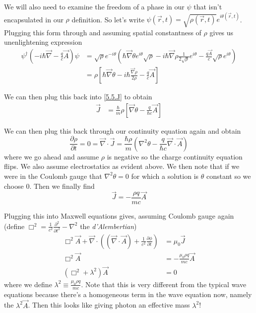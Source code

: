 \documentclass[10pt]{report}
\newcommand{\pd}[2]{\frac{\partial #1}{\partial#2}}
\newcommand{\ptd}[2]{\frac{\partial^2 #1}{\partial#2^2}}
\begin{document}
We will also need to examine the freedom of a phase in our $\psi$ that isn't encapsulated in our $\rho$ definition. So let's write $\psi(\vec{r},t) = \sqrt{\rho(\vec{r},t)} e^{i\theta(\vec{r},t)}$. Plugging this form through and assuming spatial constantness of $\rho$ gives us unenlightening expression
\begin{align}
    \psi^\dagger\left( -i\hbar \vec{\nabla} - \frac{q}{c}\vec{A} \right)\psi &= \sqrt{\rho}e^{-i\theta}\left( \hbar \vec{\nabla}\theta e^{i\theta}\sqrt{\rho} - i\hbar \vec{\nabla}\rho \frac{1}{2\sqrt{\rho}}e^{i\theta} - \frac{q\vec{A}}{c}\sqrt{\rho}e^{i\theta} \right)\\
    &= \rho\left[ \hbar \vec{\nabla}\theta - i\hbar\frac{\vec{\nabla}\rho}{2\rho} - \frac{q}{c}\vec{A} \right]
\end{align}

We can then plug this back into \eqref{5.5.J} to obtain
\begin{align}
    \vec{J} &= \frac{\hbar}{m}\rho\left[ \vec{\nabla}\theta - \frac{q}{\hbar c}\vec{A} \right]
\end{align}

We can then plug this back through our continuity equation again and obtain
\begin{equation}
    \pd{\rho}{t} = 0 = \vec{\nabla} \cdot \vec{J} = \frac{\hbar \rho}{m}\left( \nabla^2 \theta - \frac{q}{\hbar c}\vec{\nabla} \cdot \vec{A} \right)
\end{equation}
where we go ahead and assume $\rho$ is negative so the charge continuity equation flips. We also assume electrostatics as evident above. We then note that if we were in the Coulomb gauge that $\nabla^2 \theta = 0$ for which a solution is $\theta$ constant so we choose $0$. Then we finally find
\begin{equation}
    \vec{J} = -\frac{\rho q}{mc}\vec{A}
\end{equation}

Plugging this into Maxwell equations gives, assuming Coulomb gauge again (define $\Box^2 = \frac{1}{c^2}\ptd{}{t} - \nabla^2$ the \emph{d'Alembertian})
\begin{align}
    \Box^2 \vec{A} + \vec{\nabla} \cdot \left( \left( \vec{\nabla} \cdot \vec{A} \right) + \frac{1}{c^2}\pd{\phi}{t} \right) &= \mu_0 \vec{J}\\
    \Box^2 \vec{A} &= -\frac{\mu_0 \rho q}{mc}\vec{A}\\
    (\Box^2 + \lambda^2) \vec{A} &= 0
\end{align}
where we define $\lambda^2 \equiv \frac{\mu_0 \rho q}{mc}$. Note that this is very different from the typical wave equations because there's a homogeneous term in the wave equation now, namely the $\lambda^2 \vec{A}$. Then this looks like giving photon an effective mass $\lambda^2$!
\end{document}
